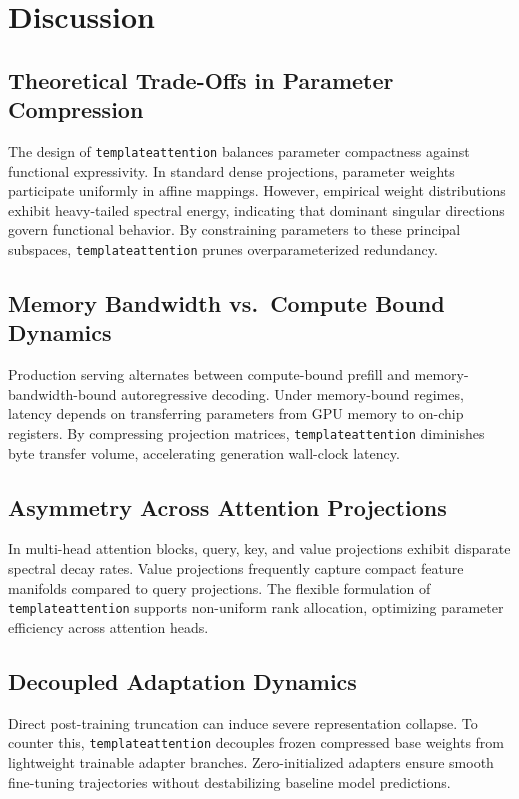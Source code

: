 \section{Discussion}

\subsection{Theoretical Trade-Offs in Parameter Compression}
The design of \texttt{templateattention} balances parameter compactness against functional expressivity. In standard dense projections, parameter weights participate uniformly in affine mappings. However, empirical weight distributions exhibit heavy-tailed spectral energy, indicating that dominant singular directions govern functional behavior. By constraining parameters to these principal subspaces, \texttt{templateattention} prunes overparameterized redundancy.

\subsection{Memory Bandwidth vs.\ Compute Bound Dynamics}
Production serving alternates between compute-bound prefill and memory-bandwidth-bound autoregressive decoding. Under memory-bound regimes, latency depends on transferring parameters from GPU memory to on-chip registers. By compressing projection matrices, \texttt{templateattention} diminishes byte transfer volume, accelerating generation wall-clock latency.

\subsection{Asymmetry Across Attention Projections}
In multi-head attention blocks, query, key, and value projections exhibit disparate spectral decay rates. Value projections frequently capture compact feature manifolds compared to query projections. The flexible formulation of \texttt{templateattention} supports non-uniform rank allocation, optimizing parameter efficiency across attention heads.

\subsection{Decoupled Adaptation Dynamics}
Direct post-training truncation can induce severe representation collapse. To counter this, \texttt{templateattention} decouples frozen compressed base weights from lightweight trainable adapter branches. Zero-initialized adapters ensure smooth fine-tuning trajectories without destabilizing baseline model predictions.


